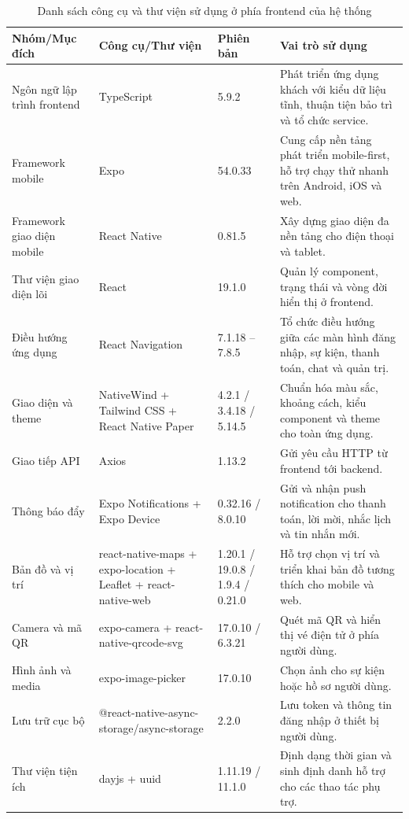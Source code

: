 \documentclass[../DoAn.tex]{subfiles}
\begin{document}
\begin{table}[H]
\centering
\scriptsize
\renewcommand{\arraystretch}{1.2}
\begin{tabular}{|p{2.5cm}|p{2.7cm}|p{1.8cm}|p{6.5cm}|}
\hline
\textbf{Nhóm/Mục đích} & \textbf{Công cụ/Thư viện} & \textbf{Phiên bản} & \textbf{Vai trò sử dụng} \\ \hline
Ngôn ngữ lập trình frontend & TypeScript & 5.9.2 & Phát triển ứng dụng khách với kiểu dữ liệu tĩnh, thuận tiện bảo trì và tổ chức service. \\ \hline
Framework mobile & Expo & 54.0.33 & Cung cấp nền tảng phát triển mobile-first, hỗ trợ chạy thử nhanh trên Android, iOS và web. \\ \hline
Framework giao diện mobile & React Native & 0.81.5 & Xây dựng giao diện đa nền tảng cho điện thoại và tablet. \\ \hline
Thư viện giao diện lõi & React & 19.1.0 & Quản lý component, trạng thái và vòng đời hiển thị ở frontend. \\ \hline
Điều hướng ứng dụng & React Navigation & 7.1.18 -- 7.8.5 & Tổ chức điều hướng giữa các màn hình đăng nhập, sự kiện, thanh toán, chat và quản trị. \\ \hline
Giao diện và theme & NativeWind + Tailwind CSS + React Native Paper & 4.2.1 / 3.4.18 / 5.14.5 & Chuẩn hóa màu sắc, khoảng cách, kiểu component và theme cho toàn ứng dụng. \\ \hline
Giao tiếp API & Axios & 1.13.2 & Gửi yêu cầu HTTP từ frontend tới backend. \\ \hline
Thông báo đẩy & Expo Notifications + Expo Device & 0.32.16 / 8.0.10 & Gửi và nhận push notification cho thanh toán, lời mời, nhắc lịch và tin nhắn mới. \\ \hline
Bản đồ và vị trí & react-native-maps + expo-location + Leaflet + react-native-web & 1.20.1 / 19.0.8 / 1.9.4 / 0.21.0 & Hỗ trợ chọn vị trí và triển khai bản đồ tương thích cho mobile và web. \\ \hline
Camera và mã QR & expo-camera + react-native-qrcode-svg & 17.0.10 / 6.3.21 & Quét mã \gls{QR} và hiển thị vé điện tử ở phía người dùng. \\ \hline
Hình ảnh và media & expo-image-picker & 17.0.10 & Chọn ảnh cho sự kiện hoặc hồ sơ người dùng. \\ \hline
Lưu trữ cục bộ & @react-native-async-storage/async-storage & 2.2.0 & Lưu token và thông tin đăng nhập ở thiết bị người dùng. \\ \hline
Thư viện tiện ích & dayjs + uuid & 1.11.19 / 11.1.0 & Định dạng thời gian và sinh định danh hỗ trợ cho các thao tác phụ trợ. \\ \hline
\end{tabular}
\caption{Danh sách công cụ và thư viện sử dụng ở phía frontend của hệ thống}
\label{table:my_label}
\end{table}
\end{document}
